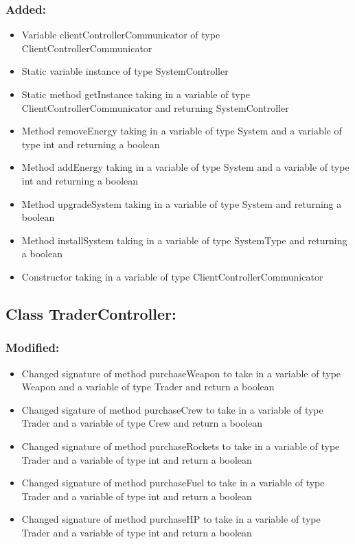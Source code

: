 \documentclass{article}
\begin{document}
\subsubsection{Added:}
\begin{itemize}
\item Variable clientControllerCommunicator of type ClientControllerCommunicator
\item Static variable instance of type SystemController
\item Static method getInstance taking in a variable of type ClientControllerCommunicator and returning SystemController
\item Method removeEnergy taking in a variable of type System and a variable of type int and returning a boolean
\item Method addEnergy taking in a variable of type System and a variable of type int and returning a boolean
\item Method upgradeSystem taking in a variable of type System and returning a boolean
\item Method installSystem taking in a variable of type SystemType and returning a boolean
\item Constructor taking in a variable of type ClientControllerCommunicator 
\end{itemize}


\subsection{Class TraderController:}

\subsubsection{Modified:}
\begin{itemize}
\item Changed signature of method purchaseWeapon to take in a variable of type Weapon and a variable of type Trader and return a boolean
\item Changed sigature of method purchaseCrew to take in a variable of type Trader and a variable of type Crew and return a boolean
\item Changed signature of method purchaseRockets to take in a variable of type Trader and a variable of type int and return a boolean
\item Changed signature of method purchaseFuel to take in a variable of type Trader and a variable of type int and return a boolean
\item Changed signature of method purchaseHP to take in a variable of type Trader and a variable of type int and return a boolean
\end{itemize}
\end{document}
